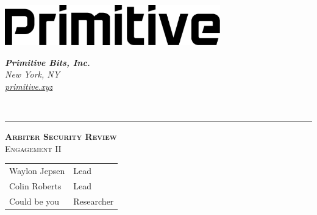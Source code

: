\begin{titlepage}
  \begin{minipage}[c]{0.4\textwidth}
    \includegraphics[width=0.70\textwidth]{img/primitive-wordmark-dark.png} \\  %
  \end{minipage}
  \hspace{0.4\textwidth}
  \begin{minipage}[c]{0.2\textwidth}
    \begin{flushleft}
        \small
        \textit{\textbf{Primitive Bits, Inc.}\\  %
        New York, NY\\
        \href{http://primitive.xyz}{primitive.xyz}\\}
    \end{flushleft}
  \end{minipage} \\
  \begin{flushleft}
    {\small\color{gray}{
    \today}}
    \vspace{2cm}  %
    \hspace{2cm}  %
    \hspace{2cm}  %
    \hrule 
    \vspace{0.5cm}  %
    \hspace{2cm}  %
    \hspace{2cm}  %
  \end{flushleft}
  \begin{flushleft}
    \textsc{\LARGE \bfseries Arbiter Security Review}\\[0.5 cm]  %
    \textsc{\large Engagement II}\\[2.0 cm]  %

    \begin{tabular}{ll}  %
      Waylon Jepsen & Lead \\
      Colin Roberts & Lead \\
      Could be you & Researcher \\
    \end{tabular}

    \vfill

  \end{flushleft}
\end{titlepage}
